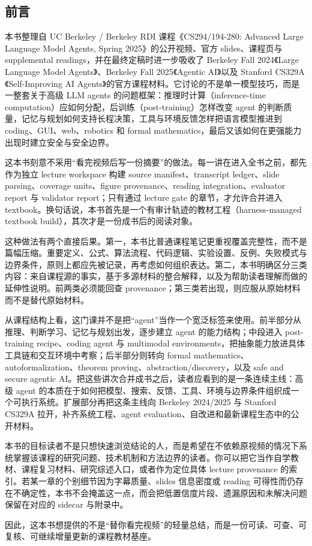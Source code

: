 \subsection*{前言}

本书整理自 UC Berkeley / Berkeley RDI 课程《CS294/194-280: Advanced Large Language Model Agents, Spring 2025》的公开视频、官方 slides、课程页与 supplemental readings，并在最终定稿时进一步吸收了 Berkeley Fall 2024《Large Language Model Agents》、Berkeley Fall 2025《Agentic AI》以及 Stanford CS329A《Self-Improving AI Agents》的官方课程材料。它讨论的不是单一模型技巧，而是一整套关于高级 LLM agents 的问题框架：推理时计算（inference-time computation）应如何分配，后训练（post-training）怎样改变 agent 的判断质量，记忆与规划如何支持长程决策，工具与环境反馈怎样把语言模型推进到 coding、GUI、web、robotics 和 formal mathematics，最后又该如何在更强能力出现时建立安全与安全边界。

这本书刻意不采用“看完视频后写一份摘要”的做法。每一讲在进入全书之前，都先作为独立 lecture workspace 构建 source manifest、transcript ledger、slide parsing、coverage units、figure provenance、reading integration、evaluator report 与 validator report；只有通过 lecture gate 的章节，才允许合并进入 textbook。换句话说，本书首先是一个有审计轨迹的教材工程（harness-managed textbook build），其次才是一份成书后的阅读对象。

这种做法有两个直接后果。第一，本书比普通课程笔记更重视覆盖完整性，而不是篇幅压缩。重要定义、公式、算法流程、代码逻辑、实验设置、反例、失败模式与边界条件，原则上都应先被记录，再考虑如何组织表达。第二，本书明确区分三类内容：来自课程源的事实，基于多源材料的整合解释，以及为帮助读者理解而做的延伸性说明。前两类必须能回查 provenance；第三类若出现，则应服从原始材料而不是替代原始材料。

从课程结构上看，这门课并不是把“agent”当作一个宽泛标签来使用。前半部分从推理、判断学习、记忆与规划出发，逐步建立 agent 的能力结构；中段进入 post-training recipe、coding agent 与 multimodal environments，把抽象能力放进具体工具链和交互环境中考察；后半部分则转向 formal mathematics、autoformalization、theorem proving、abstraction/discovery，以及 safe and secure agentic AI。把这些讲次合并成书之后，读者应看到的是一条连续主线：高级 agent 的本质在于如何把模型、搜索、反馈、工具、环境与边界条件组织成一个可执行系统。扩展部分再把这条主线向 Berkeley 2024/2025 与 Stanford CS329A 拉开，补齐系统工程、agent evaluation、自改进和最新课程生态中的公开材料。

本书的目标读者不是只想快速浏览结论的人，而是希望在不依赖原视频的情况下系统掌握该课程的研究问题、技术机制和方法边界的读者。你可以把它当作自学教材、课程复习材料、研究综述入口，或者作为定位具体 lecture provenance 的索引。若某一章的个别细节因为字幕质量、slides 信息密度或 reading 可得性而仍存在不确定性，本书不会掩盖这一点，而会把低置信度片段、遗漏原因和未解决问题保留在对应的 sidecar 与附录中。

因此，这本书想提供的不是“替你看完视频”的轻量总结，而是一份可读、可查、可复核、可继续增量更新的课程教材基座。
